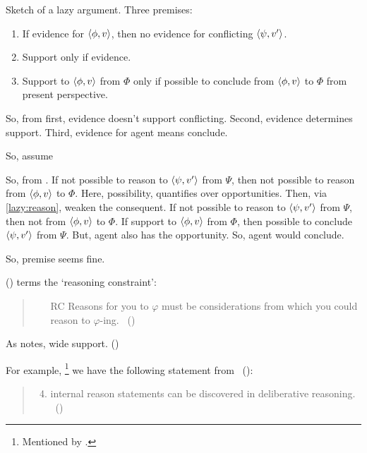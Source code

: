 \begin{note}
  Sketch of a lazy argument.
  Three premises:
  \begin{enumerate}
  \item
    \label{lazy:evidence-constraint}
    If evidence for \(\langle \phi, v \rangle\), then no evidence for conflicting \(\langle \psi, v' \rangle\).
  \item
    \label{lazy:evidence}
    Support only if evidence.
  \item
    \label{lazy:reason}
    Support to \(\langle \phi, v \rangle\) from \(\Phi\) only if possible to conclude from \(\langle \phi, v \rangle\) to \(\Phi\) from present perspective.
  \end{enumerate}

  So, from first, evidence doesn't support conflicting.
  Second, evidence determines support.
  Third, evidence for agent means conclude.

  So, assume 

  So, from \requ{}.
  If not possible to reason to \(\langle \psi, v' \rangle\) from \(\Psi\), then not possible to reason from \(\langle \phi, v \rangle\) to \(\Phi\).
  Here, possibility, quantifies over opportunities.
  Then, via \ref{lazy:reason}, weaken the consequent.
  If not possible to reason to \(\langle \psi, v' \rangle\) from \(\Psi\), then not \support{} from \(\langle \phi, v \rangle\) to \(\Phi\).
  If support to \(\langle \phi, v \rangle\) from \(\Phi\), then possible to conclude \(\langle \psi, v' \rangle\) from \(\Psi\).
  But, agent also has the opportunity.
  So, agent would conclude.

  So, premise seems fine.

  \citeauthor{Way:2016vq} (\citeyear{Way:2016vq}) terms the `reasoning constraint':

  \begin{quote}
    \begin{enumerate}
    \item[RC] Reasons for you to \(\varphi\) must be considerations from which you could reason to \(\varphi\)-ing.%
      \mbox{ }\hfill\mbox{(\citeyear[806]{Way:2016vq})}
    \end{enumerate}
  \end{quote}
  As \citeauthor{Way:2016vq} notes, wide support. (\citeyear[806]{Way:2016vq})

  For example,%
  \footnote{Mentioned by \textcite{Way:2016vq}.}
  we have the following statement from~\citeauthor{Williams:1979wi} (\citeyear{Williams:1979wi}):
  \begin{quote}
    \begin{enumerate}[label=(\roman*)]
      \setcounter{enumi}{3}
    \item internal reason statements can be discovered in deliberative reasoning.%
      \mbox{ }\hfill\mbox{(\citeyear[19]{Williams:1979wi})}
    \end{enumerate}
  \end{quote}
\end{note}

